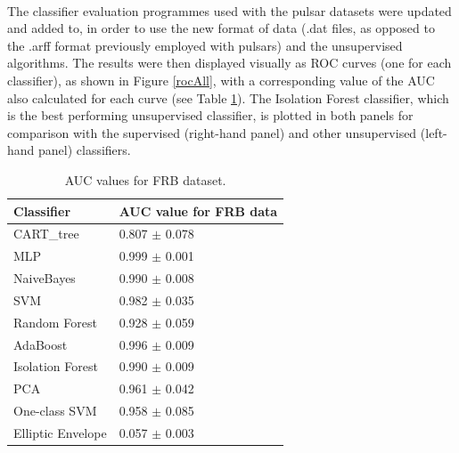 \documentclass[12pt]{article}
\begin{document}
\paragraph{}
The classifier evaluation programmes used with the pulsar datasets were updated and added to, in order to use the new format of data (.dat files, as opposed to the .arff format previously employed with pulsars) and the unsupervised algorithms. The results were then displayed visually as ROC curves (one for each classifier), as shown in Figure \ref{rocAll}, with a corresponding value of the AUC also calculated for each curve (see Table \ref{FRBauc}). The Isolation Forest classifier, which is the best performing unsupervised classifier, is plotted in both panels for comparison with the supervised (right-hand panel) and other unsupervised (left-hand panel) classifiers.

\begin{table}[]
\centering
\begin{tabular}{|l|l|}
\hline
\textbf{Classifier} & \textbf{AUC value for FRB data} 	\\ \hline
CART\_tree          & 0.807 $\pm$ 0.078            		\\ \hline
MLP                 & 0.999 $\pm$ 0.001            		\\ \hline
NaiveBayes        	& 0.990 $\pm$ 0.008           		\\ \hline
SVM                 & 0.982 $\pm$ 0.035              	\\ \hline
Random Forest      	& 0.928 $\pm$ 0.059              	\\ \hline
AdaBoost            & 0.996 $\pm$ 0.009              	\\ \hline
Isolation Forest   	& 0.990 $\pm$ 0.009              	\\ \hline
PCA                 & 0.961 $\pm$ 0.042              	\\ \hline
One-class SVM       & 0.958 $\pm$ 0.085              	\\ \hline
Elliptic Envelope   & 0.057 $\pm$ 0.003					\\ \hline
\end{tabular}
\caption{AUC values for FRB dataset.}
\label{FRBauc}
\end{table}
\end{document}
